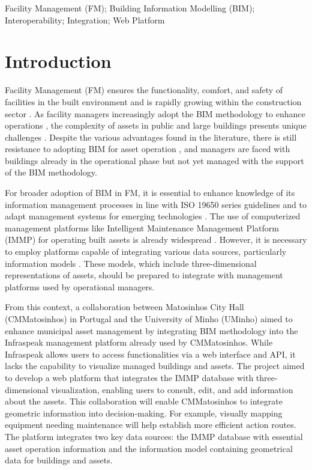 \documentclass[a4paper, 10pt, twocolumn, twoside]{article}
\begin{document}
\begin{keywords}
Facility Management (FM); Building Information Modelling (BIM); Interoperability; Integration; Web Platform
\end{keywords}


\section{Introduction}
\label{sec:Introduction}

Facility Management (FM) ensures the functionality, comfort, and safety of facilities in the built environment \cite{IFMA2023} and is rapidly growing within the construction sector \cite{Pinti2022}. As facility managers increasingly adopt the BIM methodology to enhance operations \cite{Marocco2021}, the complexity of assets in public and large buildings presents unique challenges \cite{Pinti2022}. Despite the various advantages found in the literature, there is still resistance to adopting BIM for asset operation \cite{Durdyev2022}, and managers are faced with buildings already in the operational phase but not yet managed with the support of the BIM methodology.

For broader adoption of BIM in FM, it is essential to enhance knowledge of its information management processes in line with ISO 19650 series guidelines and to adapt management systems for emerging technologies \cite{Durdyev2022}. The use of computerized management platforms like Intelligent Maintenance Management Platform (IMMP) for operating built assets is already widespread \cite{Marocco2021, Siccardi2023}. However, it is necessary to employ platforms capable of integrating various data sources, particularly information models \cite{Al-Kasasbeh2021}. These models, which include three-dimensional representations of assets, should be prepared to integrate with management platforms used by operational managers.

From this context, a collaboration between Matosinhos City Hall (CMMatosinhos) in Portugal and the University of Minho (UMinho) aimed to enhance municipal asset management by integrating BIM methodology into the Infraspeak management platform already used by CMMatosinhos. While Infraspeak allows users to access functionalities via a web interface and API, it lacks the capability to visualize managed buildings and assets. The project aimed to develop a web platform that integrates the IMMP database with three-dimensional visualization, enabling users to consult, edit, and add information about the assets.  This collaboration will enable CMMatosinhos to integrate geometric information into decision-making. For example, visually mapping equipment needing maintenance will help establish more efficient action routes. The platform integrates two key data sources: the IMMP database with essential asset operation information and the information model containing geometrical data for buildings and assets.
\end{document}
